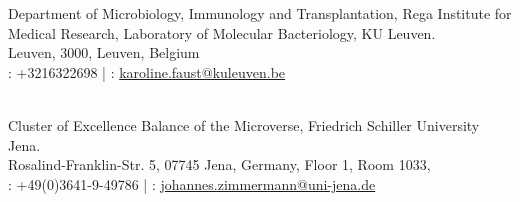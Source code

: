 \documentclass[
    a4paper,
]{../fortysecondscv}
\begin{document}

    \begin{cvtable}


            {
                Department of Microbiology, Immunology and Transplantation, Rega Institute for Medical Research, Laboratory of Molecular Bacteriology, KU Leuven.\\
                Leuven, 3000, Leuven, Belgium
                \\ 
                \faPhone: +3216322698 | 
                \faAt: \href{mailto:karoline.faust@kuleuven.be}{karoline.faust@kuleuven.be}
            }
        
        \\ 

            {
                Cluster of Excellence Balance of the Microverse, Friedrich Schiller University Jena. \\
                Rosalind-Franklin-Str. 5, 07745 Jena, Germany,
                Floor 1, Room 1033, \\ 
                \faPhone: +49(0)3641-9-49786 | 
                \faAt: \href{mailto:johannes.zimmermann@uni-jena.de}{johannes.zimmermann@uni-jena.de}
            }

            
        \\
        
        

\end{cvtable}
\end{document}
